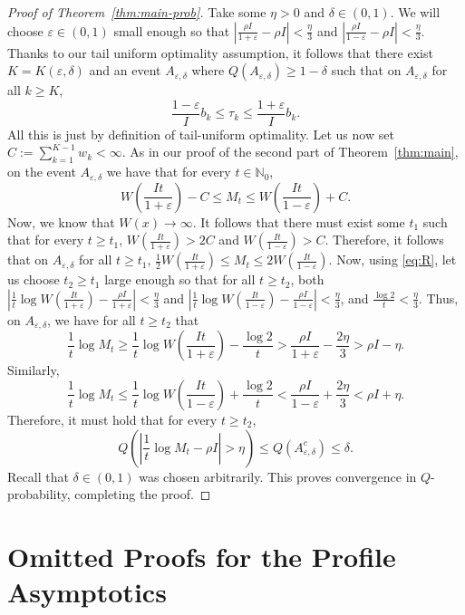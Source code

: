 \documentclass{article}
\theoremstyle{definition}
\begin{document}
\begin{proof}[Proof of Theorem~\ref{thm:main-prob}]
Take some $\eta>0$ and $\delta\in(0,1)$. We will choose $\varepsilon\in(0,1)$ small enough so that $\left|\frac{\rho I}{1+\varepsilon}-\rho I\right|<\frac{\eta}{3}$ and $\left|\frac{\rho I}{1-\varepsilon}-\rho I\right|<\frac{\eta}{3}$. Thanks to our tail uniform optimality assumption, it follows that there exist $K=K(\varepsilon,\delta)$ and an event $A_{\varepsilon,\delta}$ where $Q(A_{\varepsilon,\delta})\ge 1-\delta$ such that on $A_{\varepsilon, \delta}$ for all $k\ge K$,
\[
\frac{1-\varepsilon}{I}b_k\le \tau_k \le \frac{1+\varepsilon}{I}b_k.
\]
All this is just by definition of tail-uniform optimality. Let us now set $C:=\sum_{k=1}^{K-1} w_k<\infty$. As in our proof of the second part of Theorem~\ref{thm:main}, on the event $A_{\varepsilon,\delta}$ we have that for every $t\in\mathbb N_0$,
\[
W\left(\frac{It}{1+\varepsilon}\right)-C\le M_t\le W\left(\frac{It}{1-\varepsilon}\right)+C.
\]
Now, we know that $W(x)\to\infty$. It follows that there must exist some $t_1$ such that for every $t\ge t_1$, $W\left(\frac{It}{1+\varepsilon}\right)>2C$ and $W\left(\frac{It}{1-\varepsilon}\right)>C$. Therefore, it follows that on $A_{\varepsilon,\delta}$ for all $t\ge t_1$, $\frac12W\left(\frac{It}{1+\varepsilon}\right)\le M_t\le2W\left(\frac{It}{1-\varepsilon}\right)$. Now, using \eqref{eq:R}, let us choose $t_2\ge t_1$ large enough so that for all $t\ge t_2$, both $\left| \frac{1}{t}\log W\left(\frac{It}{1+\varepsilon}\right) - \frac{\rho I}{1+\varepsilon} \right| < \frac{\eta}{3}$ and $\left| \frac{1}{t}\log W\left(\frac{It}{1-\varepsilon}\right) - \frac{\rho I}{1-\varepsilon} \right| < \frac{\eta}{3}$, and $\frac{\log 2}{t}<\frac{\eta}{3}$. Thus, on $A_{\varepsilon,\delta}$, we have for all $t\ge t_2$ that
\[
\frac{1}{t}\log M_t \ge \frac{1}{t}\log W\left(\frac{It}{1+\varepsilon}\right)-\frac{\log 2}{t} > \frac{\rho I}{1+\varepsilon}-\frac{2\eta}{3} > \rho I-\eta.
\]
Similarly,
\[
\frac{1}{t}\log M_t \le \frac{1}{t}\log W\left(\frac{It}{1-\varepsilon}\right)+\frac{\log 2}{t} < \frac{\rho I}{1-\varepsilon}+\frac{2\eta}{3} < \rho I+\eta.
\]
Therefore, it must hold that for every $t\ge t_2$,
\[
Q\left( \left| \frac{1}{t}\log M_t-\rho I \right|>\eta \right) \le Q(A_{\varepsilon,\delta}^c) \le \delta.
\]
Recall that $\delta\in(0,1)$ was chosen arbitrarily. This proves convergence in $Q$-probability, completing the proof.
\end{proof}



\section{Omitted Proofs for the Profile Asymptotics}
\end{document}
